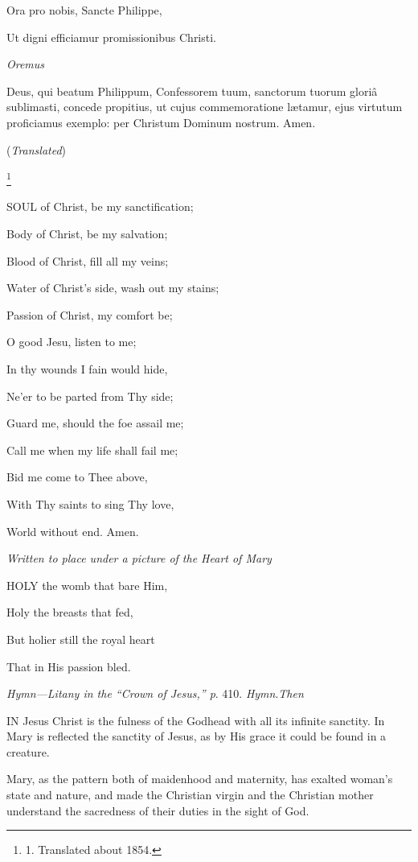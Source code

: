 Ora pro nobis, Sancte Philippe,

Ut digni efficiamur promissionibus Christi.

\emph{Oremus}

Deus, qui beatum Philippum, Confessorem tuum,
sanctorum tuorum gloriâ sublimasti, concede propitius, ut cujus
commemoratione lætamur, ejus virtutum proficiamus exemplo: per Christum
Dominum nostrum. Amen.


(\emph{Translated})

\footnote{

1. Translated about 1854.}

SOUL of Christ,
be my sanctification;

Body of Christ, be my salvation;

Blood of Christ, fill all my veins;

Water of Christ’s side, wash out my stains;

Passion of Christ, my comfort be;

O good Jesu, listen to me;

In thy wounds I fain would hide,

Ne’er to be parted from Thy side;

Guard me, should the foe assail me;

Call me when my life shall fail me;

Bid me come to Thee above,

With Thy saints to sing Thy love,

World
without end. Amen.


\emph{Written to place under a picture of the Heart
of Mary}

HOLY the womb
that bare Him,

Holy the breasts that fed,

But holier still the royal heart

That
in His passion bled.


\emph{Hymn—Litany
in the “Crown of Jesus,” p}. 410. \emph{Hymn}.\emph{Then}

IN Jesus
Christ is the fulness of the Godhead with all its infinite sanctity. In
Mary is reflected the sanctity of Jesus, as by His grace it could be
found in a creature.

Mary, as the pattern both of maidenhood and
maternity, has exalted woman’s state and nature, and made the
Christian virgin and the Christian mother understand the sacredness of
their duties in the sight of God.

